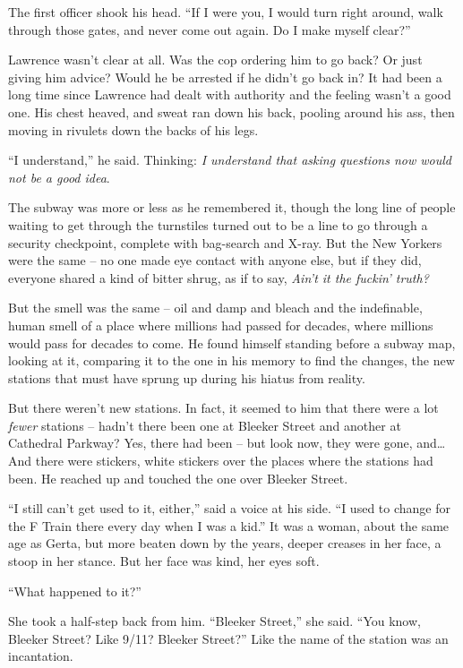 The first officer shook his head. “If I were you, I would turn right 
around, walk through those gates, and never come out again. Do I make 
myself clear?”

Lawrence wasn't clear at all. Was the cop ordering him to go back? Or 
just giving him advice? Would he be arrested if he didn't go back in? 
It had been a long time since Lawrence had dealt with authority and the 
feeling wasn't a good one. His chest heaved, and sweat ran down his 
back, pooling around his ass, then moving in rivulets down the backs of 
his legs.

“I understand,” he said. Thinking: \emph{I understand that asking 
questions now would not be a good idea}.

\tb

The subway was more or less as he remembered it, though the long line 
of people waiting to get through the turnstiles turned out to be a line 
to go through a security checkpoint, complete with bag-search and 
X-ray. But the New Yorkers were the same -- no one made eye contact 
with anyone else, but if they did, everyone shared a kind of bitter 
shrug, as if to say, \emph{Ain't it the fuckin' truth?}

But the smell was the same -- oil and damp and bleach and the 
indefinable, human smell of a place where millions had passed for 
decades, where millions would pass for decades to come. He found 
himself standing before a subway map, looking at it, comparing it to 
the one in his memory to find the changes, the new stations that must 
have sprung up during his hiatus from reality.

But there weren't new stations. In fact, it seemed to him that there 
were a lot \emph{fewer} stations -- hadn't there been one at Bleeker 
Street and another at Cathedral Parkway? Yes, there had been -- but 
look now, they were gone, and\ldots{} And there were stickers, white 
stickers over the places where the stations had been. He reached up and 
touched the one over Bleeker Street.

“I still can't get used to it, either,” said a voice at his side. 
“I used to change for the F Train there every day when I was a 
kid.” It was a woman, about the same age as Gerta, but more beaten 
down by the years, deeper creases in her face, a stoop in her stance. 
But her face was kind, her eyes soft.

“What happened to it?”

She took a half-step back from him. “Bleeker Street,” she said. 
“You know, Bleeker Street? Like 9/11? Bleeker Street?” Like the 
name of the station was an incantation.

